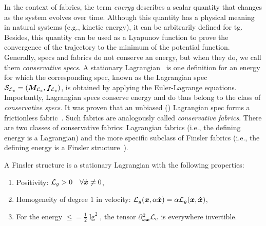 In the context of \ac{fabrics}, the term \textit{energy} describes a scalar quantity that
changes as the system evolves over time.  Although this quantity has a physical meaning in
natural systems (e.g., kinetic energy), it can be
arbitrarily defined for \ac{tg}.
Besides, this quantity can be used as
a Lyapunov function to prove the convergence of the trajectory to the minimum of the potential
function.
Generally, specs and \ac{fabrics} do not conserve an energy, but when they do, we
call them \textit{conservative specs}.  A stationary Lagrangian~\cite[Definition
4.11]{Ratliff2020} is one definition for an energy for which the corresponding spec, known
as the Lagrangian spec $\mathcal{S}_{\mathcal{L}_e} = \left(\bm{M}_{\mathcal{L}_e},\bm{f}_{\mathcal{L}_e}\right)$, is obtained by applying the
Euler-Lagrange equations. Importantly, Lagrangian specs conserve energy and do thus belong
to the class of \textit{conservative specs}.  It was proven that an unbiased
(\cite[Definition~4.11]{Ratliff2020}) Lagrangian spec forms a frictionless
fabric~\cite[Proposition~4.18]{Ratliff2020}. Such
\ac{fabrics} are analogously called
\textit{conservative fabrics}.  There are two classes of conservative fabrics: Lagrangian
fabrics (i.e., the defining energy is a Lagrangian) and the more specific subclass of
Finsler fabrics (i.e., the
defining energy is a Finsler structure~\cite[Definition 5.4]{Ratliff2020}). 
\begin{definition}
  A Finsler structure is a stationary Lagrangian \lg{} with
  the following properties:
  \begin{enumerate}
    \item Positivity: $\mathcal{L}_g>0 \quad \forall \dot{\bm{x}}\neq0$,
    \item Homogeneity of degree $1$ in velocity: $\mathcal{L}_g(\bm{x},\alpha\dot{\bm{x}}) = \alpha\mathcal{L}_g(\bm{x},\dot{\bm{x}})$,
    \item For the energy $\le = \frac{1}{2}\lg^2$, the
      tensor $\partial^2_{\dot{\bm{x}}\dot{\bm{x}}}\mathcal{L}_e$ is everywhere
      invertible.
  \end{enumerate}
\end{definition}


